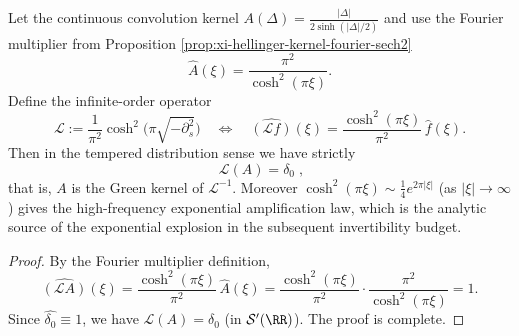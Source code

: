 \begin{proposition}\label{prop:xi-hellinger-green-operator-cosh2}
Let the continuous convolution kernel
\(
A(\Delta)=\frac{|\Delta|}{2\sinh(|\Delta|/2)}
\)
and use the Fourier multiplier from Proposition \ref{prop:xi-hellinger-kernel-fourier-sech2}
\[
\widehat A(\xi)=\frac{\pi^2}{\cosh^2(\pi\xi)}.
\]
Define the infinite-order operator
\[
\mathcal L:=\frac{1}{\pi^2}\cosh^{2}\!\bigl(\pi\sqrt{-\partial_s^{2}}\bigr)
\quad\Longleftrightarrow\quad
\widehat{(\mathcal L f)}(\xi)=\frac{\cosh^{2}(\pi\xi)}{\pi^2}\,\widehat f(\xi).
\]
Then in the tempered distribution sense we have strictly
\[
\boxed{\;\mathcal L(A)=\delta_0\;},
\]
that is, \(A\) is the Green kernel of \(\mathcal L^{-1}\).
Moreover \(\cosh^{2}(\pi\xi)\sim \tfrac14 e^{2\pi|\xi|}\) (as \(|\xi|\to\infty\)) gives the high-frequency exponential amplification law, which is the analytic source of the exponential explosion in the subsequent invertibility budget.
\end{proposition}
\begin{proof}
By the Fourier multiplier definition,
\[
\widehat{(\mathcal L A)}(\xi)
=\frac{\cosh^{2}(\pi\xi)}{\pi^2}\,\widehat A(\xi)
=\frac{\cosh^{2}(\pi\xi)}{\pi^2}\cdot\frac{\pi^2}{\cosh^{2}(\pi\xi)}
=1.
\]
Since \(\widehat{\delta_0}\equiv 1\), we have \(\mathcal L(A)=\delta_0\) (in \(\mathcal S'(\RR)\)). The proof is complete.
\end{proof}

